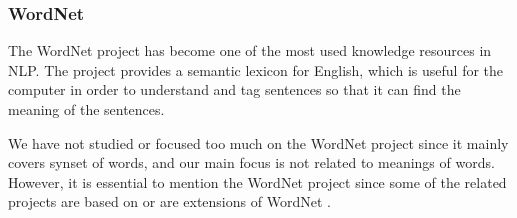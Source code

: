 
\subsubsection{WordNet}
The WordNet project has become one of the most used knowledge resources in NLP. %
The project provides a semantic lexicon for English, which is useful for the computer in order to understand and tag sentences so that it can find the meaning of the sentences. 

We have not studied or focused too much on the WordNet project since it mainly covers synset of words, and our main focus is not related to meanings of words. However, it is essential to mention the WordNet project since some of the related projects are based on or are extensions of WordNet \cite{wordnet}.


